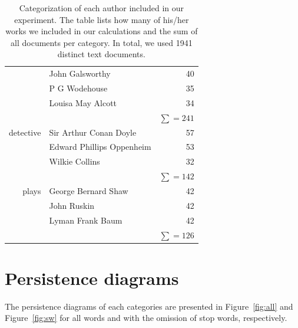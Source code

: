 \documentclass[fleqn]{article}
\begin{document}
\begin{table}[ht]
\begin{tabular}{r|l|r}
			& John Galsworthy & 40 \\
			& P G Wodehouse & 35 \\
			& Louisa May Alcott & 34 \\
			& & $\sum = 241$ \\
			\hline
			detective & Sir Arthur Conan Doyle & 57 \\
			& Edward Phillips Oppenheim & 53 \\
			& Wilkie Collins & 32 \\
			& & $\sum = 142$ \\
			\hline
			plays & George Bernard Shaw & 42 \\
			& John Ruskin & 42 \\
			& Lyman Frank Baum & 42 \\
			& & $\sum = 126$ \\
		\end{tabular}
		\caption{Categorization of each author included in our experiment. The table lists how many of his/her works we included in our calculations and the sum of all documents per category. In total, we used 1941 distinct text documents.}
		\label{tab:1}
	\end{table}
	
	\section{Persistence diagrams} \label{app:persistence}
	The persistence diagrams of each categories are presented in Figure~\ref{fig:all} and Figure~\ref{fig:sw} for all words and with the omission of stop words, respectively.
	
\end{document}
